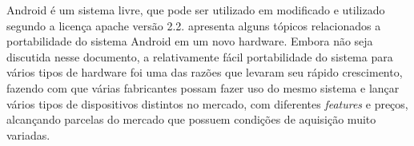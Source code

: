 Android é um sistema livre, que pode ser utilizado em modificado e utilizado segundo a licença apache versão 2.2.  apresenta alguns tópicos relacionados a portabilidade do sistema Android em um novo hardware. Embora não seja discutida nesse documento, a relativamente fácil portabilidade do sistema para vários tipos de hardware foi uma das razões que levaram seu rápido crescimento, fazendo com que várias fabricantes possam fazer uso do mesmo sistema e lançar vários tipos de dispositivos distintos no mercado, com diferentes \textit{features} e preços, alcançando parcelas do mercado que possuem condições de aquisição muito variadas.
